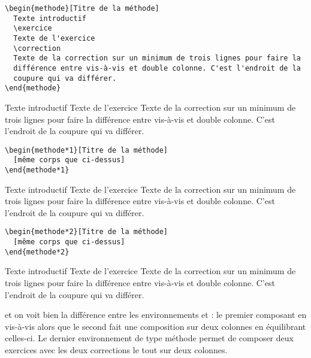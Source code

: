 \documentclass[nocrop]{sesamanuel}
\begin{document}
\begin{code}\label{exemple-methode-debut}
\begin{verbatim}
\begin{methode}[Titre de la méthode]
  Texte introductif
  \exercice
  Texte de l'exercice
  \correction
  Texte de la correction sur un minimum de trois lignes pour faire la
  différence entre vis-à-vis et double colonne. C'est l'endroit de la
  coupure qui va différer.
\end{methode}
\end{verbatim}
\end{code}
 \begin{result} 
 
 \end{result}
\begin{methode}
  Texte introductif
  \exercice
  Texte de l'exercice
  \correction
  Texte de la correction sur un minimum de trois lignes pour faire la
  différence entre vis-à-vis et double colonne. C'est l'endroit de la
  coupure qui va différer.
\end{methode}
\clearpage
\begin{code}
\begin{verbatim}
\begin{methode*1}[Titre de la méthode]
  [même corps que ci-dessus]
\end{methode*1}
\end{verbatim}
\end{code}
\begin{result}

\end{result}
\begin{methode*1}
  Texte introductif
  \exercice
  Texte de l'exercice
  \correction
  Texte de la correction sur un minimum de trois lignes pour faire la
  différence entre vis-à-vis et double colonne. C'est l'endroit de la
  coupure qui va différer.
\end{methode*1}

\begin{code}
\begin{verbatim}
\begin{methode*2}[Titre de la méthode]
  [même corps que ci-dessus]
\end{methode*2}
\end{verbatim}
\end{code}
\begin{result}

\end{result}
\begin{methode*2}
  Texte introductif
  \exercice
  Texte de l'exercice
  \correction
  Texte de la correction sur un minimum de trois lignes pour faire la
  différence entre vis-à-vis et double colonne. C'est l'endroit de la
  coupure qui va différer.
\end{methode*2}
et on voit bien la différence entre les environnements
 et  : le premier composant en
vis-à-vis alors que le second fait une composition sur deux colonnes
en équilibrant celles-ci.
\vfill\clearpage
Le dernier environnement de type \og méthode\fg{} permet de composer
deux exercices avec les deux corrections le tout sur deux colonnes. 
\end{document}
